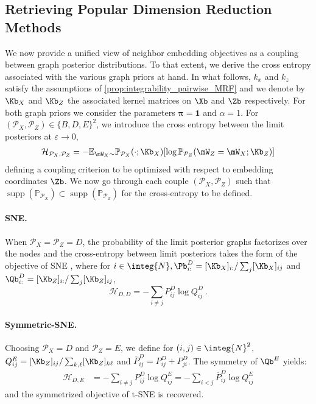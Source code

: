 \subsection{Retrieving Popular Dimension Reduction Methods}\label{sec:retrieving_DR_methods}

We now provide a unified view of neighbor embedding objectives as a coupling between graph posterior distributions. To that extent, we derive the cross entropy associated with the various graph priors at hand. In what follows, $k_x$ and $k_z$ satisfy the assumptions of \cref{prop:integrability_pairwise_MRF} and we denote by $\Kb_{X}$ and $\Kb_{Z}$ the associated kernel matrices on  $\Xb$ and $\Zb$ respectively. For both graph priors we consider the parameters $\bm{\pi}=\bm{1}$ and $\alpha=1$. For $(\mathcal{P}_{X}, \mathcal{P}_{Z}) \in \{B,D,E\}^2$, we introduce the 
cross entropy between the limit posteriors at $\varepsilon \to 0$,
\begin{align*}
    \mathcal{H}_{\mathcal{P}_X, \mathcal{P}_Z} = - \mathbb{E}_{\mW_{X} \sim }\mathbb{P}_{\mathcal{P}_X}(\cdot;\Kb_X)[\log \mathbb{P}_{\mathcal{P}_{Z}}(\mW_{Z} = \mW_{X}; \Kb_{Z})]
\end{align*}
defining a coupling criterion to be optimized with respect to embedding coordinates $\Zb$. We now go through each couple $(\mathcal{P}_{X}, \mathcal{P}_{Z})$ such that $\operatorname{supp}\left(\mathbb{P}_{\mathcal{P}_X}\right) \subset \operatorname{supp}\left(\mathbb{P}_{\mathcal{P}_Z}\right)$ for the cross-entropy to be defined.

\paragraph{SNE.}
When $\mathcal{P}_{X} = \mathcal{P}_{Z} = D$, the probability of the limit posterior graphs factorizes over the nodes and the cross-entropy between limit posteriors takes the form of the objective of SNE \citep{hinton2002stochastic}, where for $i \in \integ{N},\Pb^{D}_{i:} = [\Kb_X]_{i:} / \sum_j [\Kb_X]_{ij}$ and $\Qb^{D}_{i:} = [\Kb_{Z}]_{i:} / \sum_j [\Kb_Z]_{ij}$,
$$\mathcal{H}_{D,D}= - \sum_{i \neq j} P^{D}_{ij} \log Q^{D}_{ij} \:.$$

\paragraph{Symmetric-SNE.}
Choosing $\mathcal{P}_{X} = D$ and $\mathcal{P}_{Z} = E$, we define for $(i,j) \in \integ{N}^2$, $Q^{E}_{ij} = [\Kb_Z]_{ij} / \sum_{k,\ell}[\Kb_Z]_{k\ell}$ and $\overline{P}^{D}_{ij} = P^{D}_{ij} + P^{D}_{ji}$. The symmetry of $\Qb^{E}$ yields:
\begin{align*}
    \mathcal{H}_{D,E} &= - \sum_{i \neq j} P^{D}_{ij} \log Q^{E}_{ij} = - \sum_{i < j} \overline{P}^{D}_{ij} \log Q^{E}_{ij}
\end{align*}
and the symmetrized objective of t-SNE \citep{maaten2008tSNE} is recovered. 

